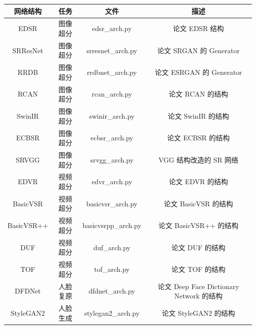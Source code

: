 \documentclass[../main.tex]{subfiles}
\begin{document}
\begin{table}[h]
    \centering
    {
        \begin{tabular}{|c|c|c|c|}
            \hline
            \textbf{网络结构} & \textbf{任务} & \textbf{文件}          & \textbf{描述}                              \\ \hline
            EDSR              & 图像超分      & edsr\_arch.py          & 论文 EDSR 结构                             \\ \hline
            SRResNet          & 图像超分      & srresnet\_arch.py      & 论文 SRGAN 的 Generator                    \\ \hline
            RRDB              & 图像超分      & rrdbnet\_arch.py       & 论文 ESRGAN 的 Generator                   \\ \hline
            RCAN              & 图像超分      & rcan\_arch.py          & 论文 RCAN 的结构                           \\ \hline
            SwinIR            & 图像超分      & swinir\_arch.py        & 论文 SwinIR 的结构                         \\ \hline
            ECBSR             & 图像超分      & ecbsr\_arch.py         & 论文 ECBSR 的结构                          \\ \hline
            SRVGG             & 图像超分      & srvgg\_arch.py         & VGG 结构改造的 SR 网络                     \\ \hline
            EDVR              & 视频超分      & edvr\_arch.py          & 论文 EDVR 的结构                           \\ \hline
            BasicVSR          & 视频超分      & basicvsr\_arch.py      & 论文 BasicVSR 的结构                       \\ \hline
            BasicVSR++        & 视频超分      & basicvsrpp\_arch.py    & 论文 BasicVSR++ 的结构                     \\ \hline
            DUF               & 视频超分      & duf\_arch.py           & 论文 DUF 的结构                            \\ \hline
            TOF               & 视频超分      & tof\_arch.py           & 论文 TOF 的结构                            \\ \hline
            DFDNet            & 人脸复原      & dfdnet\_arch.py        & 论文 Deep Face Dictionary Network 的结构   \\ \hline
            StyleGAN2         & 人脸生成      & stylegan2\_arch.py     & 论文 StyleGAN2 的结构                      \\ \hline

\end{tabular}}
\end{table}
\end{document}
